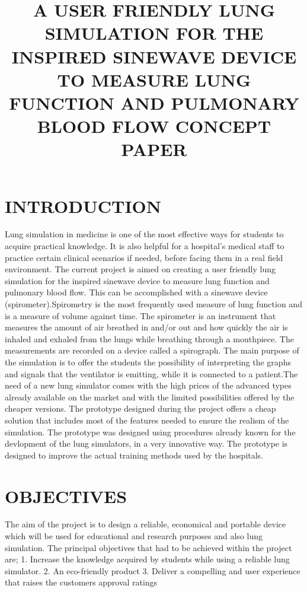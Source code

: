 \documentclass[14pt]{article}
\begin{document}
\title{A USER FRIENDLY LUNG SIMULATION FOR THE INSPIRED SINEWAVE DEVICE TO MEASURE LUNG FUNCTION AND PULMONARY BLOOD FLOW 
CONCEPT PAPER}

\maketitle



\section{INTRODUCTION}
Lung simulation in medicine is one of the most effective ways for students to acquire practical knowledge.
It is also helpful for a hospital’s medical staff to practice certain clinical scenarios if needed, before facing them in a real field environment. The current project is aimed on creating a user friendly lung simulation for the inspired sinewave device to measure lung function and pulmonary blood flow.
This can be accomplished with a sinewave device (spirometer).Spirometry is the most frequently used measure of lung function and is a measure of volume against time. The spirometer is an instrument that measures the amount of air breathed in and/or out and how
 quickly the air is inhaled and exhaled from the lungs while breathing through a mouthpiece. The measurements are recorded on a device called a spirograph. The main purpose of the simulation is to offer the students the possibility of interpreting the graphs and signals that the ventilator is emitting, while it is connected to a patient.The need of a new lung simulator comes with the high prices of the advanced types already available on the market and with the limited possibilities offered by the cheaper versions.
The prototype designed during the project offers a cheap solution that includes most of the features needed to ensure the realism of the simulation. The prototype was designed using procedures already known for the devlopment of the lung simulators, in a very innovative way. The prototype is designed to improve the actual training methods used by the hospitals.

\section{OBJECTIVES}
The aim of the project is to design a reliable, economical and portable device which will be used for educational and research purposes and also lung simulation. The principal objectives that had to be achieved within the project are;
1. Increase the knowledge acquired by students while using a reliable lung simulator.
2. An eco-friendly product
3. Deliver a compelling and user experience that raises the customers approval ratings
\end{document}
